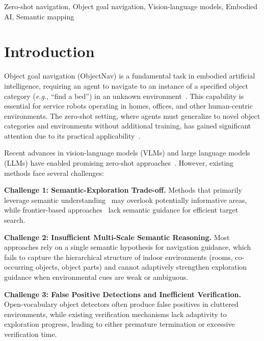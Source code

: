 \documentclass[conference]{IEEEtran}
\newcommand{\eg}{\textit{e.g.}}
\begin{document}
\begin{IEEEkeywords}
Zero-shot navigation, Object goal navigation, Vision-language models, Embodied AI, Semantic mapping
\end{IEEEkeywords}

\section{Introduction}
\label{sec:introduction}

Object goal navigation (ObjectNav) is a fundamental task in embodied artificial intelligence, requiring an agent to navigate to an instance of a specified object category (\eg, ``find a bed'') in an unknown environment~\cite{anderson2018evaluation, batra2020objectnav}. This capability is essential for service robots operating in homes, offices, and other human-centric environments. The zero-shot setting, where agents must generalize to novel object categories and environments without additional training, has gained significant attention due to its practical applicability~\cite{gadre2023cows, yokoyama2024vlfm}.

Recent advances in vision-language models (VLMs) and large language models (LLMs) have enabled promising zero-shot approaches~\cite{zhou2023esc, majumdar2022zson}. However, existing methods face several challenges:

\textbf{Challenge 1: Semantic-Exploration Trade-off.} Methods that primarily leverage semantic understanding~\cite{zhou2023esc, wu2024voronav} may overlook potentially informative areas, while frontier-based approaches~\cite{yamauchi1997frontier} lack semantic guidance for efficient target search.

\textbf{Challenge 2: Insufficient Multi-Scale Semantic Reasoning.} Most approaches rely on a single semantic hypothesis for navigation guidance, which fails to capture the hierarchical structure of indoor environments (rooms, co-occurring objects, object parts) and cannot adaptively strengthen exploration guidance when environmental cues are weak or ambiguous.

\textbf{Challenge 3: False Positive Detections and Inefficient Verification.} Open-vocabulary object detectors often produce false positives in cluttered environments, while existing verification mechanisms lack adaptivity to exploration progress, leading to either premature termination or excessive verification time.
\end{document}
